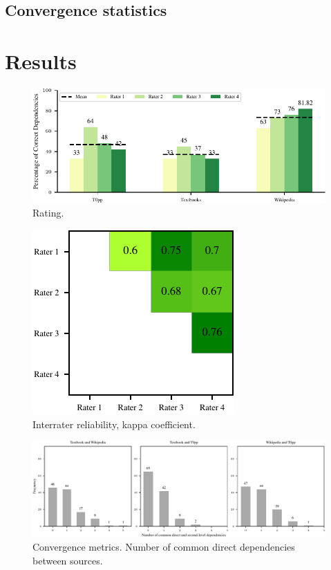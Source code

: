 \documentclass{article}
\begin{document}
\subsection{Convergence statistics}

\section{Results}



\begin{figure}[H]
    \centering
    \includegraphics[width=.95\textwidth]{img/rating.pdf}
    \caption{Rating.}
    \label{fig:rating}
\end{figure}

\begin{figure}[H]
    \centering
    \includegraphics[width=.4\textwidth]{img/kappa.pdf}
    \caption{Interrater reliability, kappa coefficient.}
    \label{fig:kappa}
\end{figure}


\begin{figure}
    \centering
    \includegraphics[width=.95\textwidth]{img/comp_direct_deps.pdf}
    \caption{Convergence metrics. Number of common direct dependencies between sources.}
    \label{fig:comp_direct_deps}
\end{figure}
\end{document}
